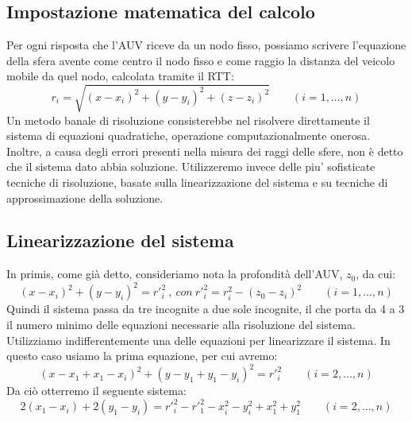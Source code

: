 \documentclass[Lau,binding=0.6cm]{sapthesis}
\begin{document}
\subsection{Impostazione matematica del calcolo}
Per ogni risposta che l'AUV riceve da un nodo fisso, possiamo scrivere l'equazione della sfera avente come centro il nodo fisso e come raggio la distanza del veicolo mobile da quel nodo, calcolata tramite il RTT: \newline
\begin{equation}
r_{i} = \sqrt{(x-x_{i})^2+(y-y_{i})^2+(z-z_{i})^2} \qquad (i = 1,...,n)
\end{equation}
\newline
Un metodo banale di risoluzione consisterebbe nel risolvere direttamente il sistema di equazioni quadratiche, operazione computazionalmente onerosa. Inoltre, a causa degli errori presenti nella misura dei raggi delle sfere, non è detto che il sistema dato abbia soluzione.
Utilizzeremo invece delle piu' sofisticate tecniche di risoluzione, basate sulla linearizzazione del sistema e su tecniche di approssimazione della soluzione.\newline

\subsection{Linearizzazione del sistema}
In primis, come già detto, consideriamo nota la profondità dell'AUV, $z_{0}$, da cui:
\begin{equation}
(x-x_{i})^2+(y-y_{i})^2 = r'^2_{i}\ ,\ con\ r'^2_{i} = r^2_{i}-(z_{0}-z_{i})^2 \qquad  (i = 1,...,n)
\end{equation}
\newline
Quindi il sistema passa da tre incognite a due sole incognite, il che porta da 4 a 3 il numero minimo delle equazioni necessarie alla risoluzione del sistema.
Utilizziamo indifferentemente una delle equazioni per linearizzare il sistema. In questo caso usiamo la prima equazione, per cui avremo:\newline
\begin{equation}
(x-x_{1}+x_{1}-x_{i})^2+(y-y_{1}+y_{1}-y_{i})^2 =  r'^2_{i} \qquad  (i = 2,...,n)
\end{equation}
\newline
Da ciò otterremo il seguente sistema:\newline
\begin{equation}
2(x_{1}-x_{i})+2(y_{1}-y_{i}) =  r'^2_{i}-r'^2_{1}-x^2_{i}-y^2_{i}+x^2_{1}+y^2_{1} \qquad (i = 2,...,n)
\end{equation}
\end{document}
